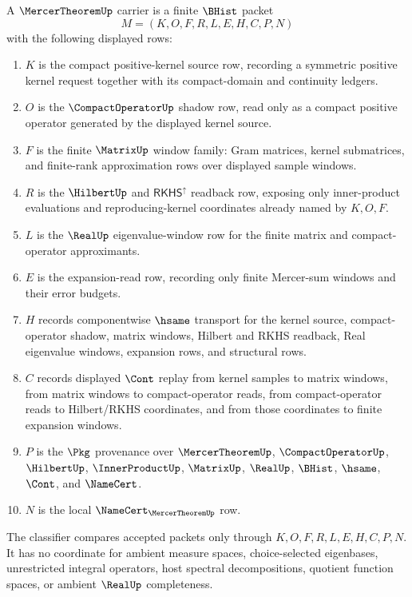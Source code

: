 \begin{definition}
\label{def:mercer-theorem-carrier}
A $\MercerTheoremUp$ carrier is a finite $\BHist$ packet
$$
M=(K,O,F,R,L,E,H,C,P,N)
$$
with the following displayed rows:
\begin{enumerate}
\item $K$ is the compact positive-kernel source row, recording a symmetric positive kernel request together with its compact-domain and continuity ledgers.
\item $O$ is the $\CompactOperatorUp$ shadow row, read only as a compact positive operator generated by the displayed kernel source.
\item $F$ is the finite $\MatrixUp$ window family: Gram matrices, kernel submatrices, and finite-rank approximation rows over displayed sample windows.
\item $R$ is the $\HilbertUp$ and $\mathsf{RKHS}^{\uparrow}$ readback row, exposing only inner-product evaluations and reproducing-kernel coordinates already named by $K,O,F$.
\item $L$ is the $\RealUp$ eigenvalue-window row for the finite matrix and compact-operator approximants.
\item $E$ is the expansion-read row, recording only finite Mercer-sum windows and their error budgets.
\item $H$ records componentwise $\hsame$ transport for the kernel source, compact-operator shadow, matrix windows, Hilbert and RKHS readback, Real eigenvalue windows, expansion rows, and structural rows.
\item $C$ records displayed $\Cont$ replay from kernel samples to matrix windows, from matrix windows to compact-operator reads, from compact-operator reads to Hilbert/RKHS coordinates, and from those coordinates to finite expansion windows.
\item $P$ is the $\Pkg$ provenance over $\MercerTheoremUp$, $\CompactOperatorUp$, $\HilbertUp$, $\InnerProductUp$, $\MatrixUp$, $\RealUp$, $\BHist$, $\hsame$, $\Cont$, and $\NameCert$.
\item $N$ is the local $\NameCert_{\MercerTheoremUp}$ row.
\end{enumerate}
The classifier compares accepted packets only through $K,O,F,R,L,E,H,C,P,N$. It has no coordinate for ambient measure spaces, choice-selected eigenbases, unrestricted integral operators, host spectral decompositions, quotient function spaces, or ambient $\RealUp$ completeness.
\end{definition}

